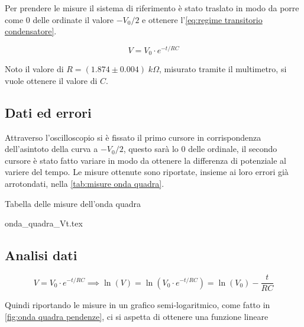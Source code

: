 \documentclass[11pt, a4paper]{article}
\numberwithin{equation}{section} %
\begin{document}
Per prendere le misure il sistema di riferimento è stato traslato in modo da porre come \(0\) delle ordinate il valore \(- V_{0}/2\) e ottenere l'\autoref{eq:regime transitorio condensatore}.

\begin{equation} \label{eq:regime transitorio condensatore}
    V = V_{0} \cdot e^{-t/RC}
\end{equation}

Noto il valore di \(R = (1.874 \pm 0.004) \; \unit{k\Omega}\), misurato tramite il multimetro, si vuole ottenere il valore di \(C\).

\subsection{Dati ed errori}

Attraverso l'oscilloscopio si è fissato il primo cursore in corrispondenza dell'asintoto della curva a \(- V_{0}/2\), questo sarà lo \(0\) delle ordinale, il secondo cursore è stato fatto variare in modo da ottenere la differenza di potenziale al variere del tempo. Le misure ottenute sono riportate, insieme ai loro errori già arrotondati, nella \autoref{tab:misure onda quadra}.


\begin{table}[ht!]
    \centering
    \caption{Tabella delle misure dell'onda quadra}
    {onda_quadra_Vt.tex}
    \label{tab:misure onda quadra}
\end{table}

\subsection{Analisi dati}

\begin{equation*}
    V = V_{0} \cdot e^{-t/RC} \implies \ln(V) = \ln(V_{0} \cdot e^{-t/RC}) = \ln(V_{0}) - \frac{t}{RC}
\end{equation*}

Quindi riportando le misure in un grafico semi-logaritmico, come fatto in \autoref{fig:onda quadra pendenze}, ci si aspetta di ottenere una funzione lineare
\end{document}
